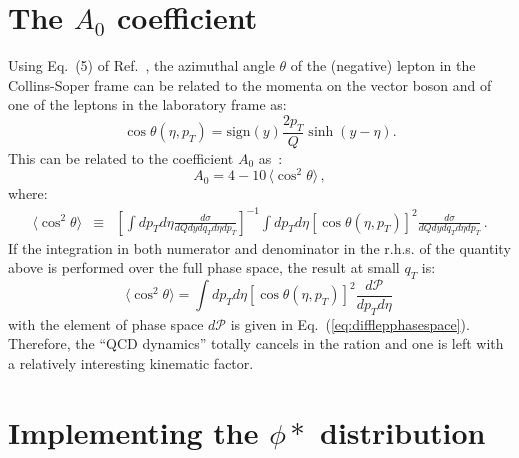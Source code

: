 \documentclass[10pt,a4paper]{article}
\begin{document}
\section{The $A_0$ coefficient}

Using Eq.~(5) of Ref.~\cite{Richter-Was:2016mal}, the azimuthal angle
$\theta$ of the (negative) lepton in the Collins-Soper frame can be
related to the momenta on the vector boson and of one of the leptons
in the laboratory frame as:
\begin{equation}\label{eq:RitterSport}
\cos\theta(\eta,p_T) = \mbox{sign}(y)\frac{2p_T}{Q}\sinh(y-\eta).
\end{equation}
This can be related to the coefficient $A_0$ as~\cite{Gauld:2017tww}:
\begin{equation}
A_0= 4 - 10\,\langle\cos^2\theta\rangle\,,
\end{equation}
where:
\begin{equation}
\begin{array}{rcl}
\displaystyle \langle\cos^2\theta\rangle &\equiv& \displaystyle  \left[\int dp_Td\eta
  \frac{d\sigma}{dQdydq_T d\eta dp_T}\right]^{-1}\int
  dp_Td\eta\left[\cos\theta(\eta, p_T)\right]^2 \frac{d\sigma}{dQdydq_T d\eta dp_T}\,.
\end{array}
\end{equation}
If the integration in both numerator and denominator in the r.h.s. of
the quantity above is performed over the full phase space, the result
at small $q_T$ is:
\begin{equation}
\langle\cos^2\theta\rangle =\int
  dp_Td\eta\left[\cos\theta(\eta, p_T)\right]^2 \frac{d\mathcal{P}}{dp_Td\eta}\,
\end{equation}
with the element of phase space $d\mathcal{P}$ is given in
Eq.~(\ref{eq:difflepphasespace}). Therefore, the ``QCD dynamics''
totally cancels in the ration and one is left with a relatively
interesting kinematic factor.

\section{Implementing the $\phi*$ distribution}
\end{document}
